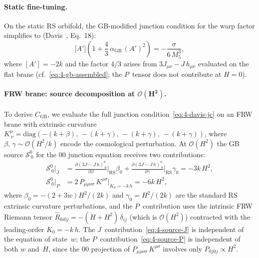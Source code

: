 \paragraph{Static fine-tuning.}
On the static RS orbifold, the GB-modified junction condition for the warp factor simplifies to (Davis~\cite{ch4:Davis2003}, Eq.~18):
\begin{equation}
  \bigl[A'\bigr]\!\left(1 + \frac{4}{3}\, \alpha_{\mathrm{GB}}\, (A')^2\right) = -\frac{\sigma}{6\, M_5^3},
  \label{eq:4-warp-jc}
\end{equation}
where $[A'] = -2k$ and the factor $4/3$ arises from $3J_{\mu\nu} - J\, h_{\mu\nu}$ evaluated on the flat brane (cf.~\eqref{eq:4-gb-assembled}; the $P$~tensor does not contribute at $H = 0$).

\paragraph{FRW brane: source decomposition at $\boldsymbol{\mathcal{O}(H^2)}$.}
To derive $C_{\mathrm{GB}}$, we evaluate the full junction condition~\eqref{eq:4-davis-jc} on an FRW brane with extrinsic curvature $K^\mu_{\ \nu} = \mathrm{diag}(-(k+\beta),\, -(k+\gamma),\, -(k+\gamma),\, -(k+\gamma))$, where $\beta,\, \gamma \sim \mathcal{O}(H^2/k)$ encode the cosmological perturbation. At $\mathcal{O}(H^2)$ the GB source $\mathcal{S}^0_{\ 0}$ for the $00$ junction equation receives two contributions:
\begin{align}
  \mathcal{S}^0_{\ 0}\big|_J &= \frac{\partial (3J - J\, h)^0_{\ 0}}{\partial \beta}\bigg|_{\mathrm{RS}}\!\beta_0
  + \frac{\partial (3J - J\, h)^0_{\ 0}}{\partial \gamma}\bigg|_{\mathrm{RS}}\!\gamma_0
  = -3k\, H^2, \label{eq:4-source-J} \\[4pt]
  \mathcal{S}^0_{\ 0}\big|_P &= 2\, P_{\mu\rho\nu\sigma}\, K^{\rho\sigma}\big|_{K_0 = -k\, h}
  = -6k\, H^2, \label{eq:4-source-P}
\end{align}
where $\beta_0 = -(2+3w)H^2/(2k)$ and $\gamma_0 = H^2/(2k)$ are the standard RS extrinsic curvature perturbations, and the $P$~contribution uses the intrinsic FRW Riemann tensor $\hat{R}_{0i0j} = -(\dot{H}+H^2)\,\delta_{ij}$ (which is $\mathcal{O}(H^2)$) contracted with the leading-order $K_0 = -k\, h$. The $J$~contribution~\eqref{eq:4-source-J} is independent of the equation of state~$w$; the $P$~contribution~\eqref{eq:4-source-P} is independent of both $w$ and~$\dot{H}$, since the $00$ projection of $P_{\mu\rho\nu\sigma}\, K^{\rho\sigma}$ involves only $P_{0j0j} \propto H^2$.


